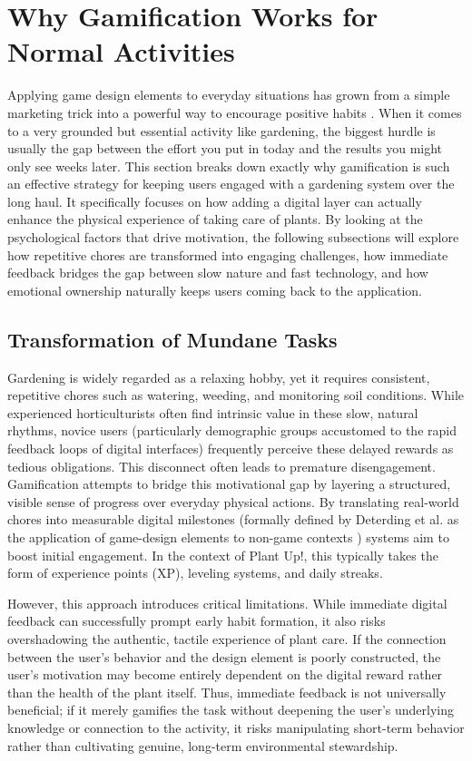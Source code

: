 \section{Why Gamification Works for Normal Activities}
Applying game design elements to everyday situations has grown from a simple marketing trick into a powerful way to encourage positive habits \cite{rewardzGamification}. 
When it comes to a very grounded but essential activity like gardening, the biggest hurdle is usually the gap between the effort you put in today and the results you might 
only see weeks later. 
This section breaks down exactly why gamification is such an effective strategy for keeping users engaged with a gardening system over the long haul. 
It specifically focuses on how adding a digital layer can actually enhance the physical experience of taking care of plants. 
By looking at the psychological factors that drive motivation, the following subsections will explore how repetitive chores are transformed into engaging challenges, how immediate feedback bridges the gap between slow nature and fast technology, and how emotional ownership naturally keeps users coming back to the application.

\subsection{Transformation of Mundane Tasks}
Gardening is widely regarded as a relaxing hobby, yet it requires consistent, repetitive chores such as watering, weeding, and monitoring soil conditions. While experienced horticulturists often find intrinsic value in these slow, natural rhythms, novice users (particularly demographic groups accustomed to the rapid feedback loops of digital interfaces) frequently perceive these delayed rewards as tedious obligations. This disconnect often leads to premature disengagement. Gamification attempts to bridge this motivational gap by layering a structured, visible sense of progress over everyday physical actions. By translating real-world chores into measurable digital milestones (formally defined by Deterding et al. as the application of game-design elements to non-game contexts \cite{deterding2011}) systems aim to boost initial engagement. In the context of Plant Up!, this typically takes the form of experience points (XP), leveling systems, and daily streaks.

However, this approach introduces critical limitations. While immediate digital feedback can successfully prompt early habit formation, it also risks overshadowing the authentic, tactile experience of plant care. If the connection between the user's behavior and the design element is poorly constructed, the user's motivation may become entirely dependent on the digital reward rather than the health of the plant itself. Thus, immediate feedback is not universally beneficial; if it merely gamifies the task without deepening the user's underlying knowledge or connection to the activity, it risks manipulating short-term behavior rather than cultivating genuine, long-term environmental stewardship.

